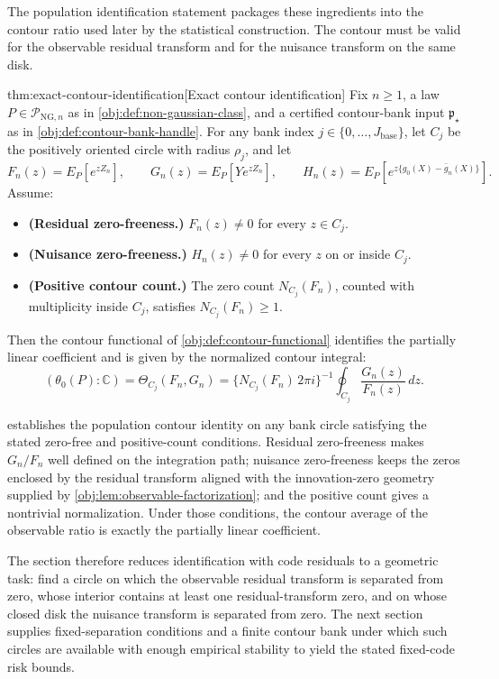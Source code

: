 \documentclass[11pt]{article}
\begin{document}
The population identification statement packages these ingredients into the contour ratio used later by the statistical construction. The contour must be valid for the observable residual transform and for the nuisance transform on the same disk.

\begin{theoremv}{thm:exact-contour-identification}[Exact contour identification]
Fix \(n\ge 1\), a law \(P\in\mathcal P_{\mathrm{NG},n}\) as in \cref{obj:def:non-gaussian-class}, and a certified contour-bank input \(\mathfrak p_{\star}\) as in \cref{obj:def:contour-bank-handle}. For any bank index \(j\in\{0,\ldots,J_{\mathrm{base}}\}\), let \(C_j\) be the positively oriented circle with radius \(\rho_j\), and let
\[
F_n(z)=E_P[e^{zZ_n}],\qquad
G_n(z)=E_P[Ye^{zZ_n}],\qquad
H_n(z)=E_P[e^{z\{g_0(X)-\bar g_n(X)\}}].
\]
Assume:
\begin{itemize}
\item \textbf{(Residual zero-freeness.)} \(F_n(z)\ne 0\) for every \(z\in C_j\).
\item \textbf{(Nuisance zero-freeness.)} \(H_n(z)\ne 0\) for every \(z\) on or inside \(C_j\).
\item \textbf{(Positive contour count.)} The zero count \(N_{C_j}(F_n)\), counted with multiplicity inside \(C_j\), satisfies \(N_{C_j}(F_n)\ge 1\).
\end{itemize}
Then the contour functional of \cref{obj:def:contour-functional} identifies the partially linear coefficient and is given by the normalized contour integral:
\[
(\theta_0(P):\mathbb C)
=
\Theta_{C_j}(F_n,G_n)
=
\{N_{C_j}(F_n)\,2\pi i\}^{-1}
\oint_{C_j}\frac{G_n(z)}{F_n(z)}\,dz .
\]
\end{theoremv}

 establishes the population contour identity on any bank circle satisfying the stated zero-free and positive-count conditions. Residual zero-freeness makes \(G_n/F_n\) well defined on the integration path; nuisance zero-freeness keeps the zeros enclosed by the residual transform aligned with the innovation-zero geometry supplied by \cref{obj:lem:observable-factorization}; and the positive count gives a nontrivial normalization. Under those conditions, the contour average of the observable ratio is exactly the partially linear coefficient.

The section therefore reduces identification with code residuals to a geometric task: find a circle on which the observable residual transform is separated from zero, whose interior contains at least one residual-transform zero, and on whose closed disk the nuisance transform is separated from zero. The next section supplies fixed-separation conditions and a finite contour bank under which such circles are available with enough empirical stability to yield the stated fixed-code risk bounds.
\end{document}
